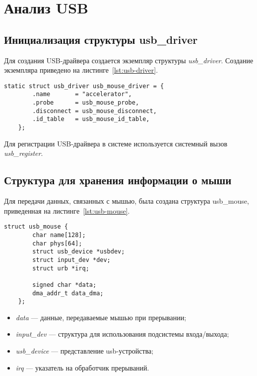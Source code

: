 \section{Анализ USB}

\subsection{Инициализация структуры usb\_driver}

Для создания USB-драйвера создается экземпляр структуры \textit{usb\_driver}. Создание экземпляра приведено на листинге~\ref{lst:usb-driver}.

\begin{lstlisting}[label=lst:usb-driver, caption=Структура usb\_driver]
	static struct usb_driver usb_mouse_driver = {
		.name		= "accelerator",
		.probe		= usb_mouse_probe,
		.disconnect	= usb_mouse_disconnect,
		.id_table	= usb_mouse_id_table,
	};
\end{lstlisting}

Для регистрации USB-драйвера в системе используется системный вызов \textit{usb\_register}.

\subsection{Структура для хранения информации о мыши}

Для передачи данных, связанных с мышью, была создана структура usb\_mouse, приведенная на листинге~\ref{lst:usb-mouse}.
\captionsetup{justification=raggedright,singlelinecheck=false}
\begin{lstlisting}[label=lst:usb-mouse, caption=Структура usb\_mouse]
	struct usb_mouse {
		char name[128];
		char phys[64];
		struct usb_device *usbdev;
		struct input_dev *dev;
		struct urb *irq;
		
		signed char *data;
		dma_addr_t data_dma;
	};
\end{lstlisting}

\begin{itemize}[label=---]
	\item \textit{data} --- данные, передаваемые мышью при прерывании;
	\item \textit{input\_dev} --- структура для использования подсистемы входа/выхода;
	\item \textit{usb\_device} --- представление usb-устройства;
	\item \textit{irq} --- указатель на обработчик прерываний.
\end{itemize}


